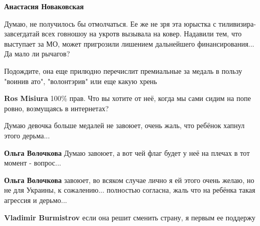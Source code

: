 \begin{itemize}
\begin{itemize}

\textbf{Анастасия Новаковская} 

Думаю, не получилось бы отмолчаться. Ее же не зря эта юрыстка с
тиливизира-завсегдатай всех говношоу на укротв вызывала на ковер. Надавили тем,
что выступает за МО, может пригрозили лишением дальнейшего финансирования... Да
мало ли рычагов?

Подождите, она еще прилюдно перечислит премиальные за медаль в пользу "воинив
ато", "волонтэрив" или еще какую хрень

 
\textbf{Ros Misiura} 100\% прав. Что вы хотите от неё, когда мы сами сидим на попе ровно, возмущаясь в интернетах?

\end{itemize}


Думаю девочка больше медалей не завоюет, очень жаль, что ребёнок хапнул этого
дерьма...

\begin{itemize}

 
\textbf{Ольга Волочкова} Думаю завоюет, а вот чей флаг будет у неё на плечах в тот момент - вопрос...


 
\textbf{Ольга Волочкова} завоюет, во всяком случае лично я ей этого очень желаю, но не для Украины, к сожалению... полностью согласна, жаль что на ребёнка такая агрессия и дерьмо...


\textbf{Vladimir Burmistrov} если она решит сменить страну, я первым ее поддержу

 

\end{itemize}
\end{itemize}
